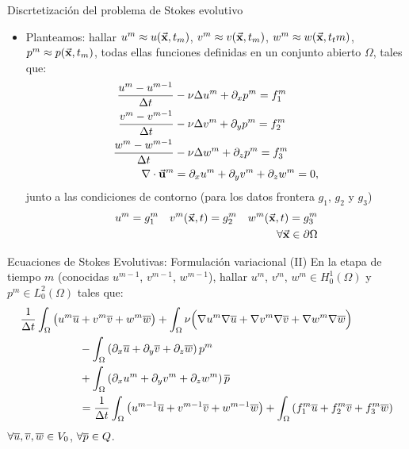 \documentclass[9pt, dvipsnames,]{beamer}
\begin{document}
\begin{frame}{Discrtetización del problema de Stokes evolutivo}

  \begin{itemize}

  \item Planteamos: hallar $u^m\approx u(\vec{\mathbf{x}},t_m)$, $v^m\approx v(\vec{\mathbf{x}},t_m)$, $w^m\approx w(\vec{\mathbf{x}},t_tm)$, $p^m\approx p(\vec{\mathbf{x}},t_m)$, todas ellas funciones definidas en un conjunto
    abierto $\Omega$, tales que:
    \begin{align}
      \frac{u^m - u^{m-1}}{\Delta t} &- \nu\Delta u^m + \partial_x p^m = f^m_1
      \\
      \frac{v^m - v^{m-1}}{\Delta t} &- \nu\Delta v^m + \partial_y p^m = f^m_2
      \\
      \frac{w^m - w^{m-1}}{\Delta t} &- \nu\Delta w^m + \partial_z p^m = f^m_3
      \\
      \nabla\cdot{}\vec{\mathbf{u}}^m &= \partial_x u^m + \partial_y v^m + \partial_z w^m = 0,
    \end{align}
    junto a las condiciones de contorno (para los datos frontera $g_1$, $g_2$ y $g_3$)
    \begin{align}
      u^m=g_1^m
      \quad
      v^m(\vec{\mathbf{x}},t)=g_2^m
      \quad
      w^m(\vec{\mathbf{x}},t)=g_3^m
      \\
    \forall \vec{\mathbf{x}}\in\partial\Omega
    \end{align}
  \end{itemize}

\end{frame}

\begin{frame}{Ecuaciones de Stokes Evolutivas: Formulación variacional (II)}
  En la etapa de tiempo $m$ (conocidas $u^{m-1}$, $v^{m-1}$, $w^{m-1}$), hallar $u^m$, $v^m$, $w^m \in H^1_0(\Omega)$ y $p^m\in L_0^2(\Omega)$ tales que:
    \begin{align*}
      \frac{1}{\Delta t} \int_\Omega\big(
      u^m \overline u
      &+ {v^m} \overline v
      + {w^m} \overline w
      \big)
      + \int_\Omega \nu\Big( \nabla u^m \nabla \overline u +
      \nabla v^m\nabla \overline v + \nabla w^m\nabla \overline w \Big)
      \\
      &- \int_\Omega \left( \partial_x \overline u + \partial_y \overline v + \partial_z \overline w \right) p^m
      \\
      &+ \int_\Omega \left( \partial_x u^m + \partial_y v^m  + \partial_z w^m \right) \overline {p}
      \\
      &=
      \frac{1}{\Delta t} \int_\Omega\big(
      u^{m-1} \overline u
      + {v^{m-1}} \overline v
      + {w^{m-1}} \overline w
      \big)
       + \int_\Omega \left( f^m_1 \overline u + f^m_2 \overline v + f^m_3 \overline w \right)
    \end{align*}
    $\forall \overline u,\overline v, \overline w\in V_0$, $\forall\overline {p}\in Q$.

\end{frame}
\end{document}
